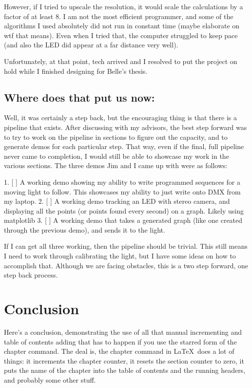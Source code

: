 \documentclass[12pt,twoside]{reedthesis}
\begin{document}
However, if I tried to upscale the resolution, it would scale the calculations by a factor of at least 8. I am not the most efficient programmer, and some of the algorithms I used absolutely did not run in constant time (maybe elaborate on wtf that means). Even when I tried that, the computer struggled to keep pace (and also the LED did appear at a far distance very well).

Unfortunately, at that point, tech arrived and I resolved to put the project on hold while I finished designing for Belle's thesis.

\section{Where does that put us now:}

Well, it was certainly a step back, but the encouraging thing is that there is a pipeline that exists. After discussing with my advisors, the best step forward was to try to work on the pipeline in sections to figure out the capacity, and to generate demos for each particular step. That way, even if the final, full pipeline never came to completion, I would still be able to showcase my work in the various sections. The three demos Jim and I came up with were as follows:

1. [ ] A working demo showing my ability to write programmed sequences for a moving light to follow. This showcases my ability to just write onto DMX from my laptop.
2. [ ] A working demo tracking an LED with stereo camera, and displaying all the points (or points found every second) on a graph. Likely using matplotlib
3. [ ] A working demo that takes a generated graph (like one created through the previous demo), and sends it to the light.

If I can get all three working, then the pipeline should be trivial. This still means I need to work through calibrating the light, but I have some ideas on how to accomplish that. Although we are facing obstacles, this is a two step forward, one step back process.


\chapter*{Conclusion}
	\setcounter{chapter}{4}
	\setcounter{section}{0}
	
Here's a conclusion, demonstrating the use of all that manual incrementing and table of contents adding that has to happen if you use the starred form of the chapter command. The deal is, the chapter command in \LaTeX\ does a lot of things: it increments the chapter counter, it resets the section counter to zero, it puts the name of the chapter into the table of contents and the running headers, and probably some other stuff. 
\end{document}
